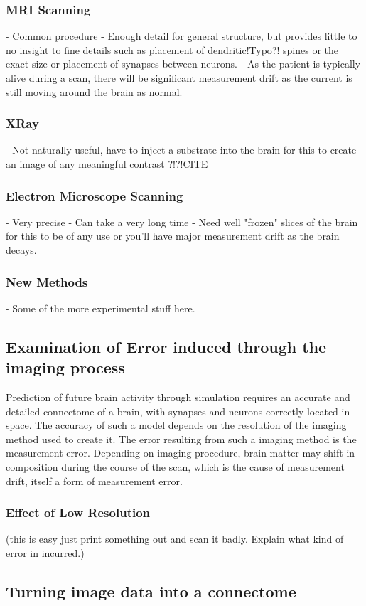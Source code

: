 \subsubsection*{MRI Scanning}

- Common procedure
- Enough detail for general structure, but provides little to no insight to fine
details such as placement of dendritic!Typo?! spines or the exact size or placement of
synapses between neurons.
- As the patient is typically alive during a scan, there will be significant
measurement drift as the current is still moving around the brain as normal.

\subsubsection*{XRay}

- Not naturally useful, have to inject a substrate into the brain for this to
create an image of any meaningful contrast ?!?!CITE

\subsubsection*{Electron Microscope Scanning}

- Very precise
- Can take a very long time
- Need well "frozen" slices of the brain for this to be of any use or you'll
have major measurement drift as the brain decays.

\subsubsection*{New Methods}

- Some of the more experimental stuff here.

\subsection[Error induced through noise]{Examination of Error induced through the imaging process}

Prediction of future brain activity through simulation requires an accurate and
detailed connectome of a brain, with synapses and neurons correctly located in
space.\autocite{bostrom_whole_2008} The accuracy of such a model depends on the
resolution of the imaging method used to create it. The error resulting from
such a imaging method is the measurement error. Depending on imaging procedure, brain matter may shift in composition during the course of the scan, which is the cause of measurement drift, itself a form of measurement error.



\subsubsection[Error induced through low resolution]{Effect of Low Resolution} 
(this is easy just print something out
and scan it badly. Explain what kind of error in incurred.)

\subsection{Turning image data into a connectome}